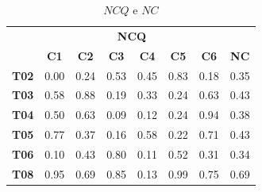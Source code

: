 \begin{table}[htbp]
	\centering
	\caption{$NCQ$ e $NC$}
	\begin{tabular}{|c|cccccc|c|}
		\hline
		\rowcolor[HTML]{D0CECE} 
		\cellcolor[HTML]{D9D9D9} & \multicolumn{6}{c|}{\cellcolor[HTML]{D0CECE}\textbf{NCQ}} & \cellcolor[HTML]{D9D9D9} \\ \cline{2-7}
		\rowcolor[HTML]{D9D9D9} 
		\multirow{-2}{*}{\cellcolor[HTML]{D9D9D9}\textbf{Participante}} & \multicolumn{1}{c|}{\cellcolor[HTML]{D9D9D9}\textbf{C1}} & \multicolumn{1}{c|}{\cellcolor[HTML]{D9D9D9}\textbf{C2}} & \multicolumn{1}{c|}{\cellcolor[HTML]{D9D9D9}\textbf{C3}} & \multicolumn{1}{c|}{\cellcolor[HTML]{D9D9D9}\textbf{C4}} & \multicolumn{1}{c|}{\cellcolor[HTML]{D9D9D9}\textbf{C5}} & \textbf{C6} & \multirow{-2}{*}{\cellcolor[HTML]{D9D9D9}\textbf{NC}} \\ \hline
		\textbf{T02} & \multicolumn{1}{c|}{0.00} & \multicolumn{1}{c|}{0.24} & \multicolumn{1}{c|}{0.53} & \multicolumn{1}{c|}{0.45} & \multicolumn{1}{c|}{0.83} & 0.18 & 0.35 \\ \hline
		\rowcolor[HTML]{D9D9D9} 
		\textbf{T03} & \multicolumn{1}{c|}{\cellcolor[HTML]{D9D9D9}0.58} & \multicolumn{1}{c|}{\cellcolor[HTML]{D9D9D9}0.88} & \multicolumn{1}{c|}{\cellcolor[HTML]{D9D9D9}0.19} & \multicolumn{1}{c|}{\cellcolor[HTML]{D9D9D9}0.33} & \multicolumn{1}{c|}{\cellcolor[HTML]{D9D9D9}0.24} & 0.63 & 0.43 \\ \hline
		\textbf{T04} & \multicolumn{1}{c|}{0.50} & \multicolumn{1}{c|}{0.63} & \multicolumn{1}{c|}{0.09} & \multicolumn{1}{c|}{0.12} & \multicolumn{1}{c|}{0.24} & 0.94 & 0.38 \\ \hline
		\rowcolor[HTML]{D9D9D9} 
		\textbf{T05} & \multicolumn{1}{c|}{\cellcolor[HTML]{D9D9D9}0.77} & \multicolumn{1}{c|}{\cellcolor[HTML]{D9D9D9}0.37} & \multicolumn{1}{c|}{\cellcolor[HTML]{D9D9D9}0.16} & \multicolumn{1}{c|}{\cellcolor[HTML]{D9D9D9}0.58} & \multicolumn{1}{c|}{\cellcolor[HTML]{D9D9D9}0.22} & 0.71 & 0.43 \\ \hline
		\textbf{T06} & \multicolumn{1}{c|}{0.10} & \multicolumn{1}{c|}{0.43} & \multicolumn{1}{c|}{0.80} & \multicolumn{1}{c|}{0.11} & \multicolumn{1}{c|}{0.52} & 0.31 & 0.34 \\ \hline
		\rowcolor[HTML]{D9D9D9} 
		\textbf{T08} & \multicolumn{1}{c|}{\cellcolor[HTML]{D9D9D9}0.95} & \multicolumn{1}{c|}{\cellcolor[HTML]{D9D9D9}0.69} & \multicolumn{1}{c|}{\cellcolor[HTML]{D9D9D9}0.85} & \multicolumn{1}{c|}{\cellcolor[HTML]{D9D9D9}0.13} & \multicolumn{1}{c|}{\cellcolor[HTML]{D9D9D9}0.99} & 0.75 & 0.69 \\ \hline

\end{tabular}
\end{table}

